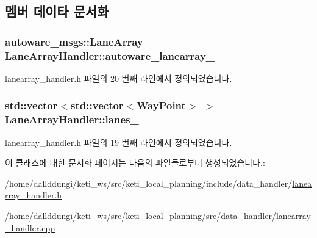 \subsection{멤버 데이타 문서화}
\subsubsection[{\texorpdfstring{autoware\+\_\+lanearray\+\_\+}{autoware_lanearray_}}]{\setlength{\rightskip}{0pt plus 5cm}autoware\+\_\+msgs\+::\+Lane\+Array Lane\+Array\+Handler\+::autoware\+\_\+lanearray\+\_\+}\hypertarget{class_lane_array_handler_ab6fec5fc6f51e9b00949766093608b6f}{}\label{class_lane_array_handler_ab6fec5fc6f51e9b00949766093608b6f}


lanearray\+\_\+handler.\+h 파일의 20 번째 라인에서 정의되었습니다.

\subsubsection[{\texorpdfstring{lanes\+\_\+}{lanes_}}]{\setlength{\rightskip}{0pt plus 5cm}std\+::vector$<$std\+::vector$<${\bf Way\+Point}$>$ $>$ Lane\+Array\+Handler\+::lanes\+\_\+}\hypertarget{class_lane_array_handler_a5f6a1e79b64a9092bfad57fd6676432b}{}\label{class_lane_array_handler_a5f6a1e79b64a9092bfad57fd6676432b}


lanearray\+\_\+handler.\+h 파일의 19 번째 라인에서 정의되었습니다.



이 클래스에 대한 문서화 페이지는 다음의 파일들로부터 생성되었습니다.\+:\begin{DoxyCompactItemize}
\item 
/home/dallddungi/keti\+\_\+ws/src/keti\+\_\+local\+\_\+planning/include/data\+\_\+handler/\hyperlink{lanearray__handler_8h}{lanearray\+\_\+handler.\+h}\item 
/home/dallddungi/keti\+\_\+ws/src/keti\+\_\+local\+\_\+planning/src/data\+\_\+handler/\hyperlink{lanearray__handler_8cpp}{lanearray\+\_\+handler.\+cpp}\end{DoxyCompactItemize}
